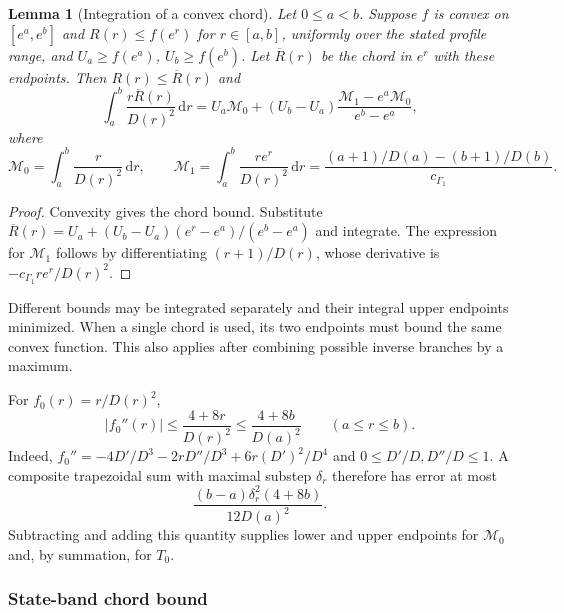 \documentclass[11pt]{article}
\newtheorem{lemma}[theorem]{Lemma}
\theoremstyle{definition}
\theoremstyle{remark}
\newcommand{\dd}{\,\mathrm d}
\begin{document}
\begin{lemma}[Integration of a convex chord]\label{lem:cert-chord}
Let $0\le a<b$.  Suppose $f$ is convex on $[e^a,e^b]$ and
$R(r)\le f(e^r)$ for $r\in[a,b]$, uniformly over the stated profile range,
and $U_a\ge f(e^a)$, $U_b\ge f(e^b)$.
Let $\overline R(r)$ be the chord in $e^r$ with these endpoints.
Then $R(r)\le\overline R(r)$ and
\begin{equation}\label{eq:cert-chord-integral}
 \int_a^b\frac{r\overline R(r)}{D(r)^2}\dd r
 = U_a\mathcal M_0+(U_b-U_a)\frac{\mathcal M_1-e^a\mathcal M_0}{e^b-e^a},
\end{equation}
where
\begin{equation}\label{eq:cert-chord-moments}
 \mathcal M_0=\int_a^b\frac r{D(r)^2}\dd r,\qquad
 \mathcal M_1=\int_a^b\frac{re^r}{D(r)^2}\dd r
 =\frac{(a+1)/D(a)-(b+1)/D(b)}{c_{\Gamma_1}}.
\end{equation}
\end{lemma}
\begin{proof}
Convexity gives the chord bound.  Substitute
$\overline R(r)=U_a+(U_b-U_a)(e^r-e^a)/(e^b-e^a)$ and integrate.
The expression for $\mathcal M_1$ follows by differentiating $(r+1)/D(r)$, whose derivative is $-c_{\Gamma_1}re^r/D(r)^2$.
\end{proof}

Different bounds may be integrated separately and their integral upper
endpoints minimized.  When a single chord is used, its two endpoints must
bound the same convex function.  This also applies after combining possible
inverse branches by a maximum.

For $f_0(r)=r/D(r)^2$,
\begin{equation}\label{eq:cert-quadrature-error}
 |f_0''(r)|\le\frac{4+8r}{D(r)^2}
              \le\frac{4+8b}{D(a)^2}\qquad(a\le r\le b).
\end{equation}
Indeed,
$f_0''=-4D'/D^3-2rD''/D^3+6r(D')^2/D^4$ and
$0\le D'/D,D''/D\le1$.
A composite trapezoidal sum with maximal substep $\delta_r$ therefore has
error at most
\[
 \frac{(b-a)\delta_r^2(4+8b)}{12D(a)^2}.
\]
Subtracting and adding this quantity supplies lower and upper endpoints
for $\mathcal M_0$ and, by summation, for $T_0$.

\subsubsection{State-band chord bound}
\end{document}
